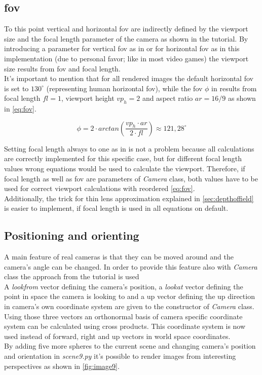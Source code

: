\documentclass[]{article}
\begin{document}
		\subsection{\ac{fov}}
		\label{sec:fov}
			To this point vertical and horizontal \ac{fov} are indirectly defined by the viewport size and the focal length parameter of the camera as shown in the tutorial. By introducing a parameter for vertical \ac{fov} as in \cite{Shirley2020RTW1} or for horizontal \ac{fov} as in this implementation (due to personal favor; like in most video games) the viewport size results from \ac{fov} and focal length.
			\\
			It's important to mention that for all rendered images the default horizontal \ac{fov} is set to $130^{\circ}$ (representing human horizontal \ac{fov}), while the \ac{fov} $\phi$ in \cite{Shirley2020RTW1} results from focal length $fl=1$, viewport height $vp_h=2$ and aspect ratio $ar=\label{key}16/9$ as shown in \cref{eq:fov}.
			
			\begin{equation}
				\label{eq:fov}
				\phi = 2\cdot arctan\left(\frac{vp_h\cdot ar}{2\cdot fl}\right) \approx 121,28^{\circ}
			\end{equation}
		 
			 Setting focal length always to one as in \cite{Shirley2020RTW1} is not a problem because all calculations are correctly implemented for this specific case, but for different focal length values wrong equations would be used to calculate the viewport. Therefore, if focal length as well as \ac{fov} are parameters of \emph{Camera} class, both values have to be used for correct viewport calculations with reordered \cref{eq:fov}. 
			 \\
			 Additionally, the trick for thin lens approximation explained in \cref{sec:depthoffield} is easier to implement, if focal length is used in all equations on default.
			
		\subsection{Positioning and orienting}
			A main feature of real cameras is that they can be moved around and the camera's angle can be changed. In order to provide this feature also with \emph{Camera} class the approach from the tutorial is used
			\\
			A \emph{lookfrom} vector defining the camera's position, a \emph{lookat} vector defining the point in space the camera is looking to and a up vector defining the up direction in camera's own coordinate system are given to the constructor of \emph{Camera} class. Using those three vectors an orthonormal basis of camera specific coordinate system can be calculated using cross products. This coordinate system is now used instead of forward, right and up vectors in world space coordinates.
			\\
			By adding five more spheres to the current scene and changing camera's position and orientation in \emph{scene9.py} it's possible to render images from interesting perspectives as shown in \cref{fig:image9}.
			
\end{document}
